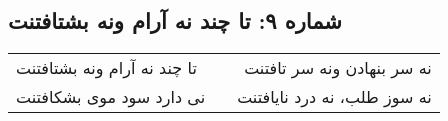 \begin{center}
\section*{شماره ۹: تا چند نه آرام ونه بشتافتنت}
\label{sec:009}
\begin{longtable}{l p{0.5cm} r}
تا چند نه آرام ونه بشتافتنت
&&
نه سر بنهادن ونه سر تافتنت
\\
نی دارد سود موی بشکافتنت
&&
نه سوز طلب، نه درد نایافتنت
\\
\end{longtable}
\end{center}
